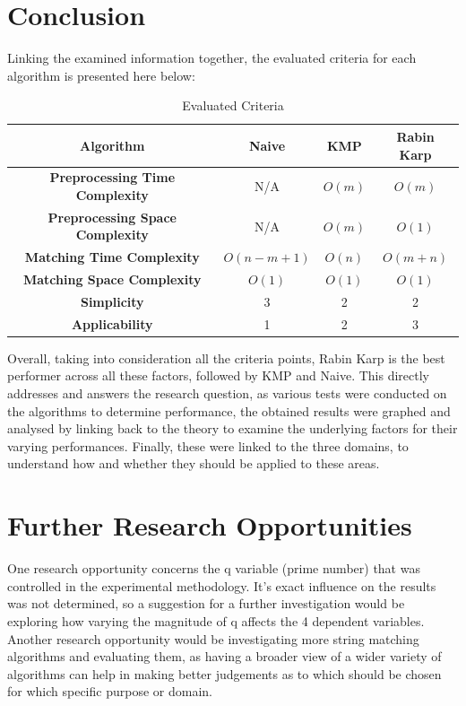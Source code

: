 \documentclass[12pt]{article}
\begin{document}
\section{Conclusion}

Linking the examined information together, the evaluated criteria for each algorithm is presented here below:
\pagebreak
\begin{table}[!htbp]
    \centering
    \begin{tabular}{|c|c|c|c|}
        \hline
        \textbf{Algorithm} & \textbf{Naive} & \textbf{KMP} & \textbf{Rabin Karp} \\
        \hline
        \textbf{Preprocessing Time Complexity} & N/A & $O(m)$ & $O(m)$ \\[0.25cm]
		\textbf{Preprocessing Space Complexity} & N/A & $O(m)$ & $O(1)$ \\[0.25cm]
        \textbf{Matching Time Complexity} & $O(n-m+1)$ & $O(n)$ & $O(m+n)$\\[0.25cm]
        \textbf{Matching Space Complexity} & $O(1)$ & $O(1)$ & $O(1)$\\[0.25cm]
        \textbf{Simplicity} & 3 & 2 & 2 \\[0.25cm]
        \textbf{Applicability} & 1 & 2 & 3 \\[0.25cm]
        \hline
    \end{tabular}
    \caption{Evaluated Criteria}
\end{table}

Overall, taking into consideration all the criteria points, Rabin Karp is the best performer across all these factors, followed by KMP and Naive. This directly addresses and answers the research question, as various tests were conducted on the algorithms to determine performance, the obtained results were graphed and analysed by linking back to the theory to examine the underlying factors for their varying performances. Finally, these were linked to the three domains, to understand how and whether they should be applied to these areas.

\section{Further Research Opportunities}
One research opportunity concerns the q variable (prime number) that was controlled in the experimental methodology. 
It's exact influence on the results was not determined, so a suggestion for a further investigation would be exploring how varying the magnitude of q affects the 4 dependent variables.
Another research opportunity would be investigating more string matching algorithms and evaluating them, as having a broader view of a wider variety of algorithms can help in making better judgements as to which should be chosen for which specific purpose or domain.

\printbibliography
\end{document}
